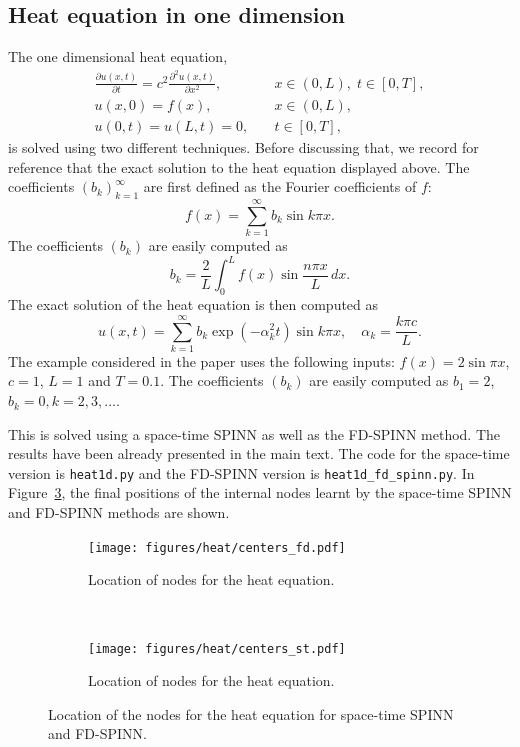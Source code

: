 \documentclass[12pt]{article}
\newcommand{\code}[1]{\lstinline{#1}}
\begin{document}
\subsection{Heat equation in one dimension}
The one dimensional heat equation,
\begin{displaymath}
\begin{split}
\frac{\partial u(x,t)}{\partial t} = c^2\frac{\partial^2 u(x,t)}{\partial x^2},& \quad x \in (0,L), \; t \in [0, T],\\
u(x, 0) = f(x),& \quad x \in (0,L),\\
u(0,t) = u(L,t) = 0,& \quad t \in [0,T],
\end{split}
\end{displaymath}
is solved using two different techniques. Before discussing that, we record for reference that the exact solution to the heat equation displayed above. The coefficients $(b_k)_{k=1}^{\infty}$ are first defined as the Fourier coefficients of $f$:
\begin{displaymath}
f(x) = \sum_{k=1}^{\infty} b_k \sin k\pi x.
\end{displaymath}
The coefficients $(b_k)$ are easily computed as
\begin{displaymath}
b_k = \frac{2}{L}\int_{0}^{L} f(x) \sin \frac{n\pi x}{L}\, dx.
\end{displaymath}
The exact solution of the heat equation is then computed as
\begin{displaymath}
u(x,t) = \sum_{k=1}^{\infty} b_k \exp (-\alpha_k^2 t) \sin k\pi x, \quad \alpha_k = \frac{k\pi c}{L}.
\end{displaymath}
The example considered in the paper uses the following inputs: $f(x) = 2\sin \pi x$, $c = 1$, $L = 1$ and $T = 0.1$. The coefficients $(b_k)$ are easily computed as $b_1 = 2$, $b_k = 0, k = 2, 3, \ldots$. 

This is solved using a space-time SPINN as well as the FD-SPINN method. The results have been already presented in the main text. The code for the space-time version is \code{heat1d.py} and the FD-SPINN version is \code{heat1d_fd_spinn.py}.  In Figure~\ref{fig:heat_nodes}, the final positions of the internal nodes learnt by the space-time SPINN and FD-SPINN methods are shown.

\begin{figure}
\begin{subfigure}{0.45\textwidth}
\centering
\texttt{[image: figures/heat/centers\_fd.pdf]}
\caption{Location of nodes for the heat equation.}
\label{fig:heat_fdnodes}
\end{subfigure}
~
\begin{subfigure}{0.45\textwidth}
\centering
\texttt{[image: figures/heat/centers\_st.pdf]}
\caption{Location of nodes for the heat equation.}
\label{fig:heat_st_nodes}
\end{subfigure}
\caption{Location of the nodes for the heat equation for space-time SPINN and FD-SPINN.}
\label{fig:heat_nodes}
\end{figure}
\end{document}
